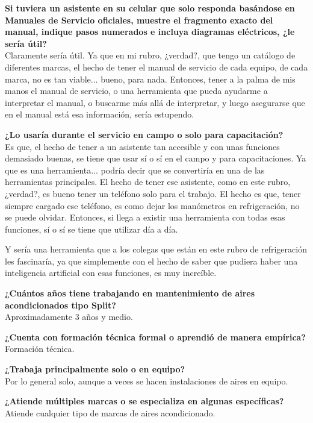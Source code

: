 {{    \textbf{Si tuviera un asistente en su celular que solo responda basándose en Manuales de Servicio oficiales, muestre el fragmento exacto del manual, indique pasos numerados e incluya diagramas eléctricos, ¿le sería útil?}\\
    Claramente sería útil. Ya que en mi rubro, ¿verdad?, que tengo un catálogo de diferentes marcas, el hecho de tener el manual de servicio de cada equipo, de cada marca, no es tan viable... bueno, para nada. Entonces, tener a la palma de mis manos el manual de servicio, o una herramienta que pueda ayudarme a interpretar el manual, o buscarme más allá de interpretar, y luego asegurarse que en el manual está esa información, sería estupendo.

    \textbf{¿Lo usaría durante el servicio en campo o solo para capacitación?}\\
    Es que, el hecho de tener a un asistente tan accesible y con unas funciones demasiado buenas, se tiene que usar sí o sí en el campo y para capacitaciones. Ya que es una herramienta... podría decir que se convertiría en una de las herramientas principales. El hecho de tener ese asistente, como en este rubro, ¿verdad?, es bueno tener un teléfono solo para el trabajo. El hecho es que, tener siempre cargado ese teléfono, es como dejar los manómetros en refrigeración, no se puede olvidar. Entonces, si llega a existir una herramienta con todas esas funciones, sí o sí se tiene que utilizar día a día.

    Y sería una herramienta que a los colegas que están en este rubro de refrigeración les fascinaría, ya que simplemente con el hecho de saber que pudiera haber una inteligencia artificial con esas funciones, es muy increíble.

    \vspace{1cm}


    \textbf{¿Cuántos años tiene trabajando en mantenimiento de aires acondicionados tipo Split?}\\
    Aproximadamente 3 años y medio.

    \textbf{¿Cuenta con formación técnica formal o aprendió de manera empírica?}\\
    Formación técnica.

    \textbf{¿Trabaja principalmente solo o en equipo?}\\
    Por lo general solo, aunque a veces se hacen instalaciones de aires en equipo.

    \textbf{¿Atiende múltiples marcas o se especializa en algunas específicas?}\\
    Atiende cualquier tipo de marcas de aires acondicionado.

}}
